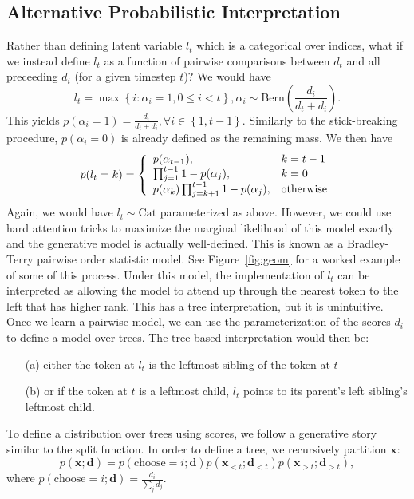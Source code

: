 \documentclass{article}
\newcommand\set[1]{\left\{#1\right\}}
\newcommand{\Cat}{\mathrm{Cat}}
\newcommand\Bern{\mathrm{Bern}}
\newcommand{\bd}{\mathbf{d}}
\newcommand{\bx}{\mathbf{x}}
\begin{document}
\subsection{Alternative Probabilistic Interpretation}
Rather than defining latent variable $l_t$ which is a categorical over indices,
what if we instead define $l_t$ as a function of pairwise comparisons between $d_t$
and all preceeding $d_i$ (for a given timestep $t$)?
We would have
$$l_t = \max \set{i : \alpha_i = 1, 0\leq i<t},
\alpha_i \sim \Bern\left(\frac{d_i}{d_t+d_i}\right).$$
This yields
$p(\alpha_i=1)=\frac{d_i}{d_t+d_i}, \forall i\in\set{1,t-1}$.
Similarly to the stick-breaking procedure, $p(\alpha_i=0)$ is already defined as the remaining mass.
We then have
\begin{equation*}
p(l_t=k) =\left\{\begin{array}{l l}
p(\alpha_{t-1}), & k=t-1\\
\prod_{j=1}^{t-1}1-p(\alpha_j), & k=0\\
p(\alpha_k)\prod_{j=k+1}^{t-1}1-p(\alpha_j), & \textrm{otherwise}
\end{array}\right.
\end{equation*}
Again, we would have $l_t\sim\Cat$ parameterized as above.
However, we could use hard attention tricks to maximize the marginal likelihood of this model exactly
and the generative model is actually well-defined.
This is known as a Bradley-Terry pairwise order statistic model.
See Figure~\ref{fig:geom} for a worked example of some of this process.
Under this model, the implementation of $l_t$ can be interpreted as allowing the model to attend up through 
the nearest token to the left that has higher rank.
This has a tree interpretation, but it is unintuitive.
Once we learn a pairwise model, we can use the parameterization of the scores $d_i$
to define a model over trees.
The tree-based interpretation would then be:
\begin{itemize}
\item[(a)] either the token at $l_t$ is the leftmost sibling of the token at $t$
\item[(b)] or if the token at $t$ is a leftmost child, $l_t$ points to its parent's left sibling's leftmost child.
\end{itemize}

To define a distribution over trees using scores, we follow a generative story
similar to the split function.
In order to define a tree, we recursively partition $\bx$:
\begin{equation}
p(\bx;\bd) = p(\textrm{choose} = i; \bd)p(\bx_{<t};\bd_{<t})p(\bx_{>t};\bd_{>t}),
\end{equation}
where $p(\textrm{choose} = i;\bd)=\frac{d_i}{\sum_j d_j}$.
\end{document}

